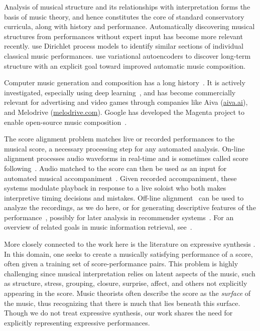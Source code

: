 \documentclass[aoas]{imsart}
\begin{document}
Analysis of musical structure and its relationships with interpretation
forms the basis of music theory, and hence constitutes the core of standard
conservatory curricula, along with history and performance. Automatically discovering musical structures
from performances without expert input has become more relevant
recently. \citet{RenDunson2010} use Dirichlet process models to identify
similar sections of individual classical music
performances. \citet{RobertsEngel2018} use variational autoencoders to
discover long-term structure with an explicit goal toward improved
automatic music composition.

Computer music generation and composition has a long
history~\citep{SturmBen-Tal2019,Boulanger-LewandowskiBengio2012,Collins2016,Ariza2005,FlossmannGrachten2013}.
It is actively investigated, especially using deep
learning~\citep{HadjeresPachet2017}, and has become commercially
relevant for advertising and video games through companies like
Aiva (\url{aiva.ai}), and Melodrive (\url{melodrive.com}). Google has
developed the Magenta project to enable open-source music
composition~\citep{RobertsHawthorne2018}.


The score alignment problem matches live or recorded performances to
the musical score, a necessary processing step for any 
automated analysis. On-line alignment processes audio waveforms in
real-time and is sometimes called score
following~\citep{DannenbergRaphael2006,Cont2010,ContSchwarz2007,ArztWidmer2015}. Audio
matched to the score can then be used as an input for automated
musical accompaniment~\citep{Raphael2010,Vercoe1985,Dannenberg1985}.
Given recorded accompaniment, these systems modulate playback
in response to a live soloist who both makes interpretive timing
decisions and mistakes. Off-line alignment~\citep{Earis2007} can be
used to analyze the recordings, as we do here, or for
generating descriptive features of the
performance~\citep{ThickstunHarchaoui2017}, possibly for later
analysis in recommender
systems~\citep{McFeeLanckriet2011,OordDieleman2013}.
For an overview of %
related goals in music information retrieval,
see~\citet{schedl2014music}.

More closely connected to the work here is the literature
on expressive synthesis \citep{Grindlay, Flossman, Widmer, Maezawa,
Bresin, Arcos}.  In this domain, one seeks to create a musically
satisfying performance of a score, often given a training set of
score-performance pairs.
This problem is highly challenging
since musical interpretation relies on latent aspects of the music,
such as structure, stress, grouping, closure, surprise, affect,
and others not explicitly appearing in the score.  Music theorists often
describe the score as the {\em surface} of the music, thus recognizing
that there is much that lies beneath this surface.  Though we do not
treat expressive synthesis, our work shares the need for explicitly
representing expressive performances.%
\end{document}

